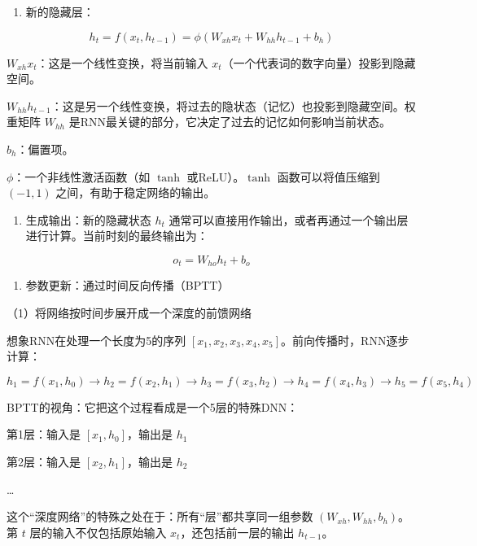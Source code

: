 \begin{enumerate}
\def\labelenumi{\arabic{enumi}.}
\tightlist
\item
{}
  新的隐藏层：
\end{enumerate}

\[
h_t=f(x_t,h_{t-1})=\phi(W_{xh}x_t+W_{hh}h_{t-1}+b_h)
\]

\(W_{xh}x_t\)：这是一个线性变换，将当前输入 \(x_t\)（一个代表词的数字向量）投影到隐藏空间。

\(W_{hh}h_{t-1}\)：这是另一个线性变换，将过去的隐状态（记忆）也投影到隐藏空间。权重矩阵 \(W_{hh}\) 是RNN最关键的部分，它决定了过去的记忆如何影响当前状态。

\(b_h\)：偏置项。

\(\phi\)：一个非线性激活函数（如 \(\tanh\) 或ReLU）。\(\tanh\) 函数可以将值压缩到 \((-1,1)\) 之间，有助于稳定网络的输出。

\begin{enumerate}
\def\labelenumi{\arabic{enumi}.}
\setcounter{enumi}{1}
\tightlist
\item
{}
  生成输出：新的隐藏状态 \(h_t\) 通常可以直接用作输出，或者再通过一个输出层进行计算。当前时刻的最终输出为：
\end{enumerate}

\[
o_t=W_{ho}h_t+b_o
\]

\begin{enumerate}
\def\labelenumi{\arabic{enumi}.}
\setcounter{enumi}{2}
\tightlist
\item
  参数更新：通过时间反向传播（BPTT）
\end{enumerate}

（1）将网络按时间步展开成一个深度的前馈网络

想象RNN在处理一个长度为5的序列 \([x_1,x_2,x_3,x_4,x_5]\)。前向传播时，RNN逐步计算：

\[
h_1=f(x_1,h_0)\to h_2=f(x_2,h_1)\to h_3=f(x_3,h_2)\to h_4=f(x_4,h_3)\to h_5=f(x_5,h_4)
\]

BPTT的视角：它把这个过程看成是一个5层的特殊DNN：

第1层：输入是 \([x_1,h_0]\)，输出是 \(h_1\)

第2层：输入是 \([x_2,h_1]\)，输出是 \(h_2\)

\ldots{}

这个``深度网络''的特殊之处在于：所有``层''都共享同一组参数 \((W_{xh}, W_{hh}, b_h)\)。第 \(t\) 层的输入不仅包括原始输入 \(x_t\)，还包括前一层的输出 \(h_{t-1}\)。

